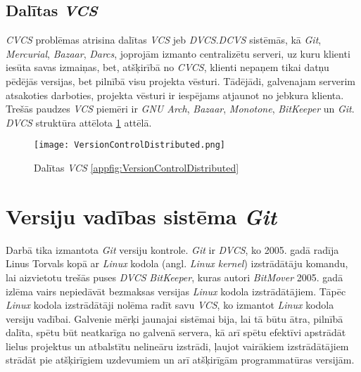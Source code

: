 \subsection{Dalītas \textit{VCS}}
\textit{CVCS} problēmas atrisina dalītas \textit{VCS} jeb \textit{DVCS}.\textit{DCVS} sistēmās, kā \textit{Git}, \textit{Mercurial}, \textit{Bazaar}, \textit{Darcs}, joprojām izmanto centralizētu serveri, uz kuru klienti iesūta savas izmaiņas, bet, atšķirībā no \textit{CVCS}, klienti nepaņem tikai datņu pēdējās versijas, bet pilnībā visu projekta vēsturi. Tādējādi, galvenajam serverim atsakoties darboties, projekta vēsturi ir iespējams atjaunot no jebkura klienta. Trešās paudzes \textit{VCS} piemēri ir \textit{GNU Arch}, \textit{Bazaar}, \textit{Monotone}, \textit{BitKeeper} un \textit{Git}. \textit{DVCS} struktūra attēlota \ref{fig:VersionControlDistributed} attēlā. \cite[DVCS]{chacon2014progit}
\begin{figure}[H]%
	\centering
	\captionsetup{justification=centering}
	\texttt{[image: VersionControlDistributed.png]}
	\caption{Dalītas \textit{VCS} \ref{appfig:VersionControlDistributed}}
	\label{fig:VersionControlDistributed}
\end{figure}

\section{Versiju vadības sistēma \textit{Git}}
Darbā tika izmantota \textit{Git} versiju kontrole. %
\textit{Git} ir \textit{DVCS}, ko 2005. gadā radīja Linus Torvals kopā ar \textit{Linux} kodola (angl. \textit{Linux kernel}) izstrādātāju komandu, lai aizvietotu trešās puses \textit{DVCS}  \textit{BitKeeper}, kuras autori \textit{BitMover} 2005. gadā izlēma vairs nepiedāvāt bezmaksas versijas  \textit{Linux} kodola izstrādātājiem. Tāpēc \textit{Linux} kodola izstrādātāji nolēma radīt savu \textit{VCS}, ko izmantot \textit{Linux} kodola versiju vadībai. Galvenie mērķi jaunajai sistēmai bija, lai tā būtu ātra, pilnībā dalīta, spētu būt neatkarīga no galvenā servera, kā arī spētu efektīvi apstrādāt lielus projektus un atbalstītu nelineāru izstrādi, ļaujot vairākiem izstrādātājiem strādāt pie atšķirīgiem uzdevumiem un arī atšķirīgām programmatūras versijām.

